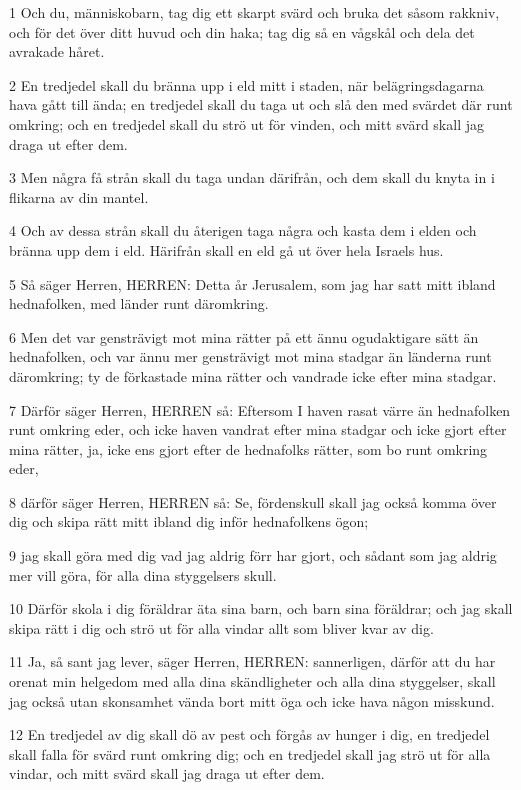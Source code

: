 \par 1 Och du, människobarn, tag dig ett skarpt svärd och bruka det såsom rakkniv, och för det över ditt huvud och din haka; tag dig så en vågskål och dela det avrakade håret.
\par 2 En tredjedel skall du bränna upp i eld mitt i staden, när belägringsdagarna hava gått till ända; en tredjedel skall du taga ut och slå den med svärdet där runt omkring; och en tredjedel skall du strö ut för vinden, och mitt svärd skall jag draga ut efter dem.
\par 3 Men några få strån skall du taga undan därifrån, och dem skall du knyta in i flikarna av din mantel.
\par 4 Och av dessa strån skall du återigen taga några och kasta dem i elden och bränna upp dem i eld. Härifrån skall en eld gå ut över hela Israels hus.
\par 5 Så säger Herren, HERREN: Detta år Jerusalem, som jag har satt mitt ibland hednafolken, med länder runt däromkring.
\par 6 Men det var gensträvigt mot mina rätter på ett ännu ogudaktigare sätt än hednafolken, och var ännu mer gensträvigt mot mina stadgar än länderna runt däromkring; ty de förkastade mina rätter och vandrade icke efter mina stadgar.
\par 7 Därför säger Herren, HERREN så: Eftersom I haven rasat värre än hednafolken runt omkring eder, och icke haven vandrat efter mina stadgar och icke gjort efter mina rätter, ja, icke ens gjort efter de hednafolks rätter, som bo runt omkring eder,
\par 8 därför säger Herren, HERREN så: Se, fördenskull skall jag också komma över dig och skipa rätt mitt ibland dig inför hednafolkens ögon;
\par 9 jag skall göra med dig vad jag aldrig förr har gjort, och sådant som jag aldrig mer vill göra, för alla dina styggelsers skull.
\par 10 Därför skola i dig föräldrar äta sina barn, och barn sina föräldrar; och jag skall skipa rätt i dig och strö ut för alla vindar allt som bliver kvar av dig.
\par 11 Ja, så sant jag lever, säger Herren, HERREN: sannerligen, därför att du har orenat min helgedom med alla dina skändligheter och alla dina styggelser, skall jag också utan skonsamhet vända bort mitt öga och icke hava någon misskund.
\par 12 En tredjedel av dig skall dö av pest och förgås av hunger i dig, en tredjedel skall falla för svärd runt omkring dig; och en tredjedel skall jag strö ut för alla vindar, och mitt svärd skall jag draga ut efter dem.
